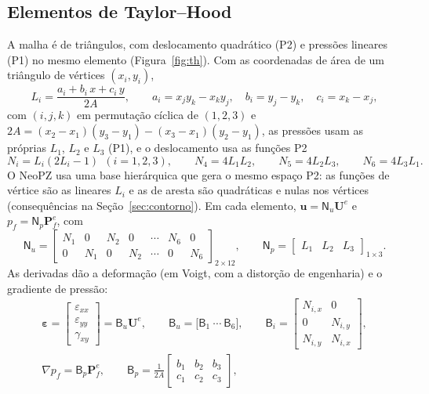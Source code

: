 \documentclass[11pt,a4paper]{article}
\newcommand{\vu}{\bm u}
\newcommand{\teps}{\bm\varepsilon}
\newcommand{\mt}[1]{\mathsf{#1}}
\begin{document}
\subsection{Elementos de Taylor--Hood}
\label{sec:elementos}
A malha é de triângulos, com deslocamento quadrático (P2) e pressões lineares (P1) no mesmo
elemento (Figura~\ref{fig:th}). Com as coordenadas de área de um triângulo de vértices
$(x_i,y_i)$,
\begin{equation}
L_i=\frac{a_i+b_i\,x+c_i\,y}{2A},\qquad
a_i=x_jy_k-x_ky_j,\quad b_i=y_j-y_k,\quad c_i=x_k-x_j,
\label{eq:area}
\end{equation}
com $(i,j,k)$ em permutação cíclica de $(1,2,3)$ e
$2A=(x_2-x_1)(y_3-y_1)-(x_3-x_1)(y_2-y_1)$, as pressões usam as próprias $L_1$, $L_2$
e $L_3$ (P1), e o deslocamento usa as funções P2
\begin{equation}
N_i=L_i(2L_i-1)\ \ (i=1,2,3),\qquad N_4=4L_1L_2,\qquad N_5=4L_2L_3,\qquad N_6=4L_3L_1 .
\label{eq:formas}
\end{equation}
O NeoPZ usa uma base hierárquica que gera o mesmo espaço P2: as funções de vértice são as
lineares $L_i$ e as de aresta são quadráticas e nulas nos vértices (consequências na
Seção~\ref{sec:contorno}). Em cada elemento, $\vu=\mt N_u\mathbf U^e$ e
$p_f=\mt N_p\mathbf P^e_f$, com
\[
\mt N_u=\begin{bmatrix}N_1&0&N_2&0&\cdots&N_6&0\\0&N_1&0&N_2&\cdots&0&N_6\end{bmatrix}_{2\times12},
\qquad
\mt N_p=\begin{bmatrix}L_1&L_2&L_3\end{bmatrix}_{1\times3}.
\]
As derivadas dão a deformação (em Voigt, com a distorção de engenharia) e o gradiente de
pressão:
\begin{equation}
\begin{gathered}
\teps=\begin{bmatrix}\varepsilon_{xx}\\\varepsilon_{yy}\\\gamma_{xy}\end{bmatrix}=\mt B_u\mathbf U^e,\qquad
\mt B_u=\big[\mt B_1\ \cdots\ \mt B_6\big],\qquad
\mt B_i=\begin{bmatrix}N_{i,x}&0\\0&N_{i,y}\\N_{i,y}&N_{i,x}\end{bmatrix},\\
\nabla p_f=\mt B_p\mathbf P^e_f,\qquad
\mt B_p=\frac1{2A}\begin{bmatrix}b_1&b_2&b_3\\c_1&c_2&c_3\end{bmatrix},
\end{gathered}
\label{eq:B}
\end{equation}
\end{document}
